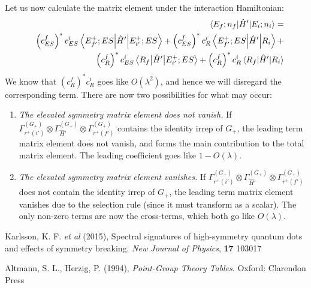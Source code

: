 \documentclass[12pt]{article}
\begin{document}
	Let us now calculate the matrix element under the interaction Hamiltonian:
	\begin{eqnarray*}
	&&\mel{E_f;n_f}{\hat{H}'}{E_i;n_i}=\\
	&&\left(c_{ES}^f\right)^* c_{ES}^i \mel{E_{f'}^+;ES}{\hat{H}'}{E_{i'}^+;ES}+\left(c_{ES}^f\right)^* c_R^i \mel{E_{f'}^+;ES}{\hat{H}'}{R_i} + \\
	&&\left(c_{R}^f\right)^* c_{ES}^i\mel{R_f}{\hat{H}'}{E_{i'}^+;ES} + \left(c_{R}^f\right)^* c_R^i \mel{R_f}{\hat{H}'}{R_i}
	\end{eqnarray*}
	We know that $\left(c_{R}^f\right)^* c_R^i$ goes like $O\left(\lambda^2\right)$, and hence we will disregard the corresponding term. There are now two possibilities for what may occur:
	\begin{enumerate}
	\item \textit{The elevated symmetry matrix element does not vanish.} If $\Gamma^{\left(G_+\right)}_{r^+(i')}\otimes \Gamma^{\left(G_+\right)}_{\hat{H}'}\otimes \Gamma^{\left(G_+\right)}_{r^+(f')}$ contains the identity irrep of $G_+$, the leading term matrix element does not vanish, and forms the main contribution to the total matrix element. The leading coefficient goes like $1-O(\lambda)$.
	\item \textit{The elevated symmetry matrix element vanishes.} If $\Gamma^{\left(G_+\right)}_{r^+(i')}\otimes \Gamma^{\left(G_+\right)}_{\hat{H}'}\otimes \Gamma^{\left(G_+\right)}_{r^+(f')}$ does not contain the identity irrep of $G_+$, the leading term matrix element vanishes due to the selection rule (since it must transform as a scalar). The only non-zero terms are now the cross-terms, which both go like $O(\lambda)$.
	\end{enumerate}
	
	
	\begin{thebibliography}{10}

Karlsson, K. F. \textit{et al} (2015), Spectral signatures of high-symmetry quantum dots and effects of symmetry breaking. \textit{New Journal of Physics}, \textbf{17} 103017

Altmann, S. L., Herzig, P. (1994), \textit{Point-Group Theory Tables}. Oxford: Clarendon Press


\end{thebibliography}	
	
\end{document}
